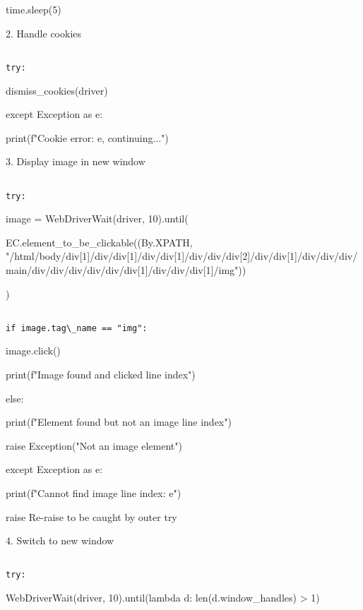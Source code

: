 time.sleep(5)

  2. Handle cookies

\begin{verbatim}

try:

\end{verbatim}

dismiss\_cookies(driver)

except Exception as e:

print(f"Cookie error: {e}, continuing...")

  3. Display image in new window

\begin{verbatim}

try:

\end{verbatim}

image = WebDriverWait(driver, 10).until(

EC.element\_to\_be\_clickable((By.XPATH, "/html/body/div[1]/div/div[1]/div/div[1]/div/div/div[2]/div/div[1]/div/div/div/main/div/div/div/div/div/div[1]/div/div/div[1]/img"))

)

\begin{verbatim}

if image.tag\_name == "img":

\end{verbatim}

image.click()

print(f"Image found and clicked line {index}")

else:

print(f"Element found but not an image line {index}")

raise Exception("Not an image element")

except Exception as e:

print(f"Cannot find image line {index}: {e}")

raise    Re-raise to be caught by outer try

  4. Switch to new window

\begin{verbatim}

try:

\end{verbatim}

WebDriverWait(driver, 10).until(lambda d: len(d.window\_handles) > 1)

